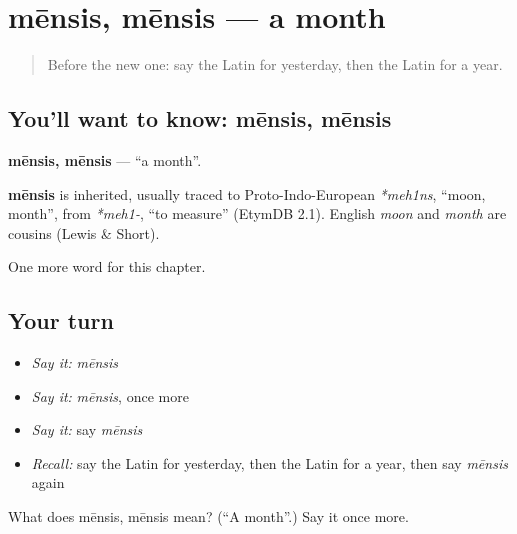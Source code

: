\section[mēnsis, mēnsis]{mēnsis, mēnsis — a month}

\label{lesson:LA-C103-mensis}



\begin{quote}
Before the new one: say the Latin for yesterday, then the Latin for a year.
\end{quote}

\subsection*{You'll want to know: mēnsis, mēnsis}
\textbf{mēnsis, mēnsis} — \textquotedblleft{}a month\textquotedblright{}.

\begin{cousinweb}
\textbf{mēnsis} is inherited, usually traced to Proto-Indo-European \emph{*meh1ns}, \textquotedblleft{}moon, month\textquotedblright{}, from \emph{*meh1-}, \textquotedblleft{}to measure\textquotedblright{} (EtymDB 2.1). English \emph{moon} and \emph{month} are cousins (Lewis \& Short).
\end{cousinweb}

\begin{grammarlens}[title={What you've built}]
One more word for this chapter.
\end{grammarlens}

\subsection*{Your turn}
\begin{itemize}
\raggedright
  \item \emph{Say it:} \emph{mēnsis}
  \item \emph{Say it:} \emph{mēnsis}, once more
  \item \emph{Say it:} say \emph{mēnsis}
  \item \emph{Recall:} say the Latin for yesterday, then the Latin for a year, then say \emph{mēnsis} again
\end{itemize}

\begin{tcolorbox}[breakable,colback=teal!4,colframe=teal!35!black,title={Before you move on}]
What does mēnsis, mēnsis mean? (\textquotedblleft{}A month\textquotedblright{}.) Say it once more.
\end{tcolorbox}
